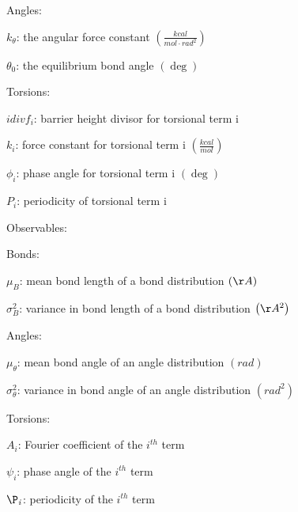 \documentclass{report}
\begin{document}
\begin{outline}
\begin{outline}
\begin{outline}
        \item{Angles:}
          \begin{outline}
            \item{$k_{\theta}$: the angular force constant $\left(\frac{kcal}{mol \cdot rad^2} \right)$}
            \item{$\theta_0$: the equilibrium bond angle $\left(\deg \right)$}
          \end{outline}
        \item{Torsions:}
          \begin{outline}
            \item{$idivf_{\mathit{i}}$: barrier height divisor for torsional term i}
            \item{$k_{\mathit{i}}$: force constant for torsional term i $\left(\frac{kcal}{mol} \right)$}
            \item{$\phi_{\mathit{i}}$: phase angle for torsional term i $\left(\deg \right)$}
            \item{$P_{\mathit{i}}$: periodicity of torsional term i}
          \end{outline}
      \end{outline}
    \item{Observables:}
      \begin{outline}
        \item{Bonds:}
          \begin{outline}
            \item{$\mu_{B}$: mean bond length of a bond distribution $\left(\AA \right)$}
            \item{$\sigma_{B}^2$: variance in bond length of a bond distribution $\left(\AA^2 \right)$}
          \end{outline}
        \item{Angles:}
          \begin{outline}
            \item{$\mu_{\theta}$: mean bond angle of an angle distribution $\left(rad \right)$}
            \item{$\sigma_{\theta}^2$: variance in bond angle of an angle distribution $\left(rad^2 \right)$}
          \end{outline}
        \item{Torsions:}
          \begin{outline}
            \item{$A_{\mathit{i}}$: Fourier coefficient of the $i^{th}$ term}
            \item{$\psi_{\mathit{i}}$: phase angle of the $i^{th}$ term} 
            \item{$\P_{\mathit{i}}$: periodicity of the $i^{th}$ term}
          \end{outline}
      \end{outline}
    \end{outline}   
  \end{outline} 
\end{document}

